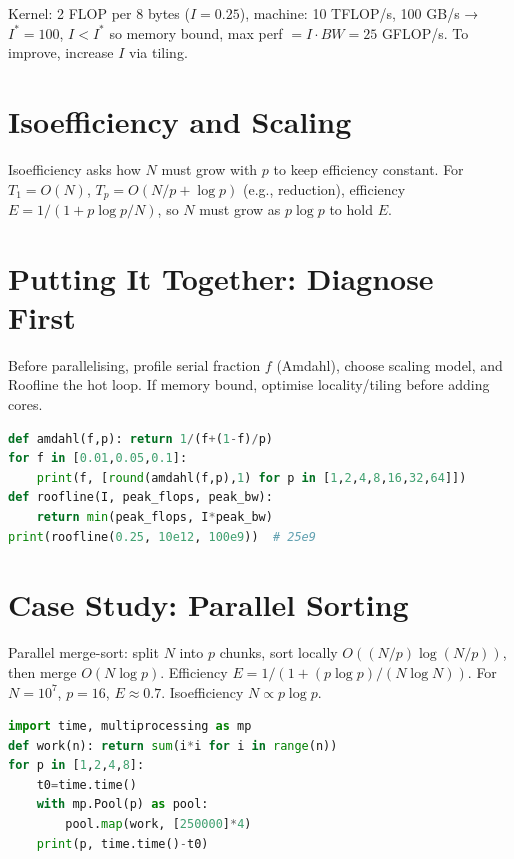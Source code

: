 \begin{example} Kernel: 2 FLOP per 8 bytes ($I=0.25$), machine: 10 TFLOP/s, 100 GB/s → $I^*=100$, $I<I^*$ so memory bound, max perf $=I\cdot BW=25$ GFLOP/s. To improve, increase $I$ via tiling.
\end{example}

\section{Isoefficiency and Scaling}\label{sec:isoefficiency}
Isoefficiency asks how $N$ must grow with $p$ to keep efficiency constant. For $T_1=O(N)$, $T_p=O(N/p+ \log p)$ (e.g., reduction), efficiency $E=1/(1+ p\log p/N)$, so $N$ must grow as $p\log p$ to hold $E$.

\section{Putting It Together: Diagnose First}\label{sec:diagnose}
Before parallelising, profile serial fraction $f$ (Amdahl), choose scaling model, and Roofline the hot loop. If memory bound, optimise locality/tiling before adding cores.

\begin{center}
\begin{lstlisting}[language=Python,caption={Amdahl and Roofline calculators.}]
def amdahl(f,p): return 1/(f+(1-f)/p)
for f in [0.01,0.05,0.1]:
    print(f, [round(amdahl(f,p),1) for p in [1,2,4,8,16,32,64]])
def roofline(I, peak_flops, peak_bw):
    return min(peak_flops, I*peak_bw)
print(roofline(0.25, 10e12, 100e9))  # 25e9
\end{lstlisting}
\end{center}


\section{Case Study: Parallel Sorting}\label{sec:sort-case}
Parallel merge-sort: split $N$ into $p$ chunks, sort locally $O((N/p)\log(N/p))$, then merge $O(N\log p)$. Efficiency $E = 1/(1+ (p\log p)/ (N\log N))$. For $N=10^7$, $p=16$, $E\approx0.7$. Isoefficiency $N\propto p\log p$.

\begin{lstlisting}[language=Python,caption={Strong vs weak scaling measurement.}]
import time, multiprocessing as mp
def work(n): return sum(i*i for i in range(n))
for p in [1,2,4,8]:
    t0=time.time()
    with mp.Pool(p) as pool:
        pool.map(work, [250000]*4)
    print(p, time.time()-t0)
\end{lstlisting}


